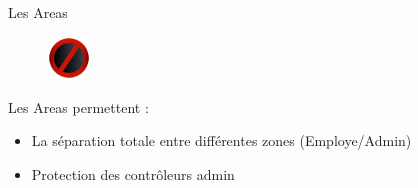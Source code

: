 \begin{frame}{Les Areas}
\begin{figure}[h!]
  \includegraphics[width=0.10\textwidth]{images/no__not__stop__wrong-512}
\end{figure}
  Les Areas permettent :
  \begin{itemize}
  \item La séparation totale entre différentes zones (Employe/Admin)
  \item Protection des contrôleurs admin
  \end{itemize}
\end{frame}